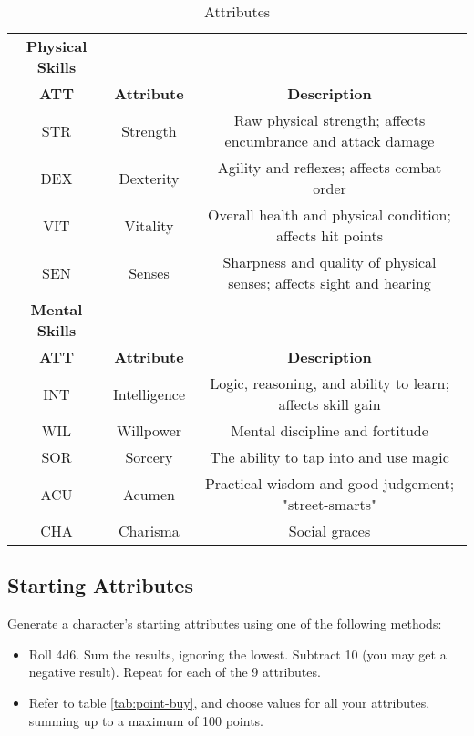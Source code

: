 
\begin{table}[h!]
    \begin{tabular}{c c c}
        \bfseries{Physical Skills} \\
        \bfseries{ATT} & \bfseries{Attribute} & \bfseries{Description} \\
        STR & Strength & Raw physical strength; affects encumbrance and attack damage \\
        DEX & Dexterity & Agility and reflexes; affects combat order \\
        VIT & Vitality & Overall health and physical condition; affects hit points \\
        SEN & Senses & Sharpness and quality of physical senses; affects sight and hearing \\
        \bfseries{Mental Skills} \\
        \bfseries{ATT} & \bfseries{Attribute} & \bfseries{Description} \\
        INT & Intelligence & Logic, reasoning, and ability to learn; affects skill gain \\
        WIL & Willpower & Mental discipline and fortitude \\
        SOR & Sorcery & The ability to tap into and use magic \\
        ACU & Acumen & Practical wisdom and good judgement; "street-smarts" \\
        CHA & Charisma & Social graces \\
    \end{tabular}
    \label{tab:attributes}
    \caption{Attributes}
\end{table}

\subsection{Starting Attributes}
Generate a character's starting attributes using one of the following methods:
\begin{itemize}
    \item Roll 4d6. Sum the results, ignoring the lowest. Subtract 10 (you may
        get a negative result). Repeat for each of the 9 attributes.
    \item Refer to table \ref{tab:point-buy}, and choose values for all your
        attributes, summing up to a maximum of 100 points.
\end{itemize}

